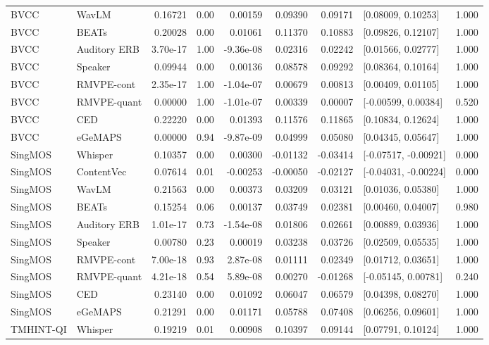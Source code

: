 \begin{longtable}{llrrrrrlr}
BVCC & WavLM & 0.16721 & 0.00 & 0.00159 & 0.09390 & 0.09171 & [0.08009, 0.10253] & 1.000 \\
BVCC & BEATs & 0.20028 & 0.00 & 0.01061 & 0.11370 & 0.10883 & [0.09826, 0.12107] & 1.000 \\
BVCC & Auditory ERB & 3.70e-17 & 1.00 & -9.36e-08 & 0.02316 & 0.02242 & [0.01566, 0.02777] & 1.000 \\
BVCC & Speaker & 0.09944 & 0.00 & 0.00136 & 0.08578 & 0.09292 & [0.08364, 0.10164] & 1.000 \\
BVCC & RMVPE-cont & 2.35e-17 & 1.00 & -1.04e-07 & 0.00679 & 0.00813 & [0.00409, 0.01105] & 1.000 \\
BVCC & RMVPE-quant & 0.00000 & 1.00 & -1.01e-07 & 0.00339 & 0.00007 & [-0.00599, 0.00384] & 0.520 \\
BVCC & CED & 0.22220 & 0.00 & 0.01393 & 0.11576 & 0.11865 & [0.10834, 0.12624] & 1.000 \\
BVCC & eGeMAPS & 0.00000 & 0.94 & -9.87e-09 & 0.04999 & 0.05080 & [0.04345, 0.05647] & 1.000 \\
SingMOS & Whisper & 0.10357 & 0.00 & 0.00300 & -0.01132 & -0.03414 & [-0.07517, -0.00921] & 0.000 \\
SingMOS & ContentVec & 0.07614 & 0.01 & -0.00253 & -0.00050 & -0.02127 & [-0.04031, -0.00224] & 0.000 \\
SingMOS & WavLM & 0.21563 & 0.00 & 0.00373 & 0.03209 & 0.03121 & [0.01036, 0.05380] & 1.000 \\
SingMOS & BEATs & 0.15254 & 0.06 & 0.00137 & 0.03749 & 0.02381 & [0.00460, 0.04007] & 0.980 \\
SingMOS & Auditory ERB & 1.01e-17 & 0.73 & -1.54e-08 & 0.01806 & 0.02661 & [0.00889, 0.03936] & 1.000 \\
SingMOS & Speaker & 0.00780 & 0.23 & 0.00019 & 0.03238 & 0.03726 & [0.02509, 0.05535] & 1.000 \\
SingMOS & RMVPE-cont & 7.00e-18 & 0.93 & 2.87e-08 & 0.01111 & 0.02349 & [0.01712, 0.03651] & 1.000 \\
SingMOS & RMVPE-quant & 4.21e-18 & 0.54 & 5.89e-08 & 0.00270 & -0.01268 & [-0.05145, 0.00781] & 0.240 \\
SingMOS & CED & 0.23140 & 0.00 & 0.01092 & 0.06047 & 0.06579 & [0.04398, 0.08270] & 1.000 \\
SingMOS & eGeMAPS & 0.21291 & 0.00 & 0.01171 & 0.05788 & 0.07408 & [0.06256, 0.09601] & 1.000 \\
TMHINT-QI & Whisper & 0.19219 & 0.01 & 0.00908 & 0.10397 & 0.09144 & [0.07791, 0.10124] & 1.000 \\

\end{longtable}
